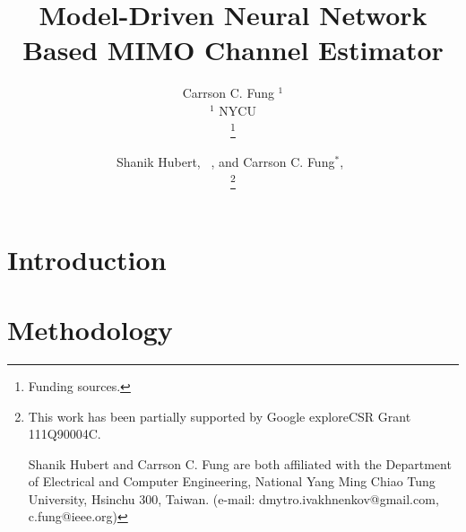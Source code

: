 \documentclass[a4paper, 12pt, onecolumn, journal, twoside, draftclsnofoot]{IEEEtran}
\title{\vspace{-0.2em} \huge Model-Driven Neural Network Based MIMO Channel Estimator}
\author{Carrson C. Fung $^1$ \\ %
$^1$ NYCU  \\
\thanks{Funding sources.}
}
\author{Shanik Hubert, ~\IEEEmembership{Student Member,~IEEE}, and Carrson C. Fung$^*$,~\IEEEmembership{Member,~IEEE} \\
\thanks{This work has been partially supported by Google exploreCSR Grant 111Q90004C.

Shanik Hubert and Carrson C. Fung  are both affiliated with the Department of Electrical and Computer Engineering, National Yang Ming Chiao Tung University, Hsinchu 300, Taiwan. (e-mail: dmytro.ivakhnenkov@gmail.com, c.fung@ieee.org)}
}
\begin{document}
\maketitle

\begin{abstract}
\end{abstract}

\begin{IEEEkeywords}
\end{IEEEkeywords}

\section{Introduction}	\label{intro}


  
\section{Methodology} \label{sec_meth}
\end{document}
